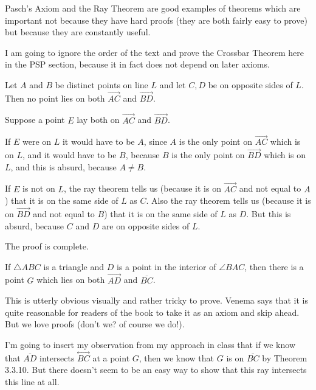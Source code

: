 \documentclass[12pt]{article}
\newcommand\Line[1]{\overset{\leftrightarrow}{#1}}
\begin{document}
Pasch's Axiom and the Ray Theorem are good examples of theorems which are important not because they have hard proofs (they are both fairly easy to prove) but because they are constantly useful.

I am going to ignore the order of the text and prove the Crossbar Theorem here in the PSP section, because it in fact does not depend on later axioms.

\begin{description}

\item[Lemma (Z-theorem):]  Let $A$ and $B$ be distinct points on line $L$ and let $C,D$ be on opposite sides of $L$.
Then no point lies on both $\overrightarrow{AC}$ and $\overrightarrow{BD}$.

\item[Proof:]  Suppose a point $E$ lay both on $\overrightarrow{AC}$ and $\overrightarrow{BD}$.

If $E$ were on $L$ it would have to be $A$, since $A$ is the only point on $\overrightarrow{AC}$ which is on $L$,
and it would have to be $B$, because $B$ is the only point on $\overrightarrow{BD}$ which is on $L$, and this is absurd, because $A \neq B$.

If $E$ is not on $L$, the ray theorem tells us (because it is on $\overrightarrow{AC}$ and not equal to $A$) that it is on the same side of $L$ as $C$.  Also the ray theorem tells us (because it is on $\overrightarrow{BD}$ and not equal to $B$) that it is on the same side of $L$ as $D$.  But this is absurd, because $C$ and $D$ are on opposite sides of $L$.

The proof is complete.

\item[Crossbar Theorem:]  If $\triangle{ABC}$ is a triangle and $D$ is a point in the interior of $\angle BAC$, then there is a point $G$ which lies on both $\overrightarrow{AD}$ and $\overline{BC}$.

\item  This is utterly obvious visually and rather tricky to prove.  Venema says that it is quite reasonable for readers of the book to take it as an axiom and skip ahead.  But we love proofs (don't we?  of course we do!).

I'm going to insert my observation from my approach in class that if we know that $\overline{AD}$ intersects $\Line{BC}$ at a point $G$, then we know that $G$ is on $\overline{BC}$ by Theorem 3.3.10.  But there doesn't seem to be an easy way to show that this ray intersects this line at all.


\end{description}
\end{document}
